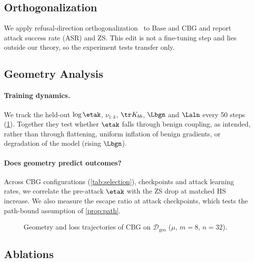 \subsection{Orthogonalization}
\label{sec:orthogonal}

We apply refusal-direction orthogonalization~\citep{arditi2024refusal} to Base and CBG and report attack success rate (ASR) and ZS. This edit is not a fine-tuning step and lies outside our theory, so the experiment tests transfer only.

\subsection{Geometry Analysis}
\label{sec:barrier_analysis}

\paragraph{Training dynamics.}
We track the held-out $\log\etak$, $\nu_{1:k}$, $\tr K_{bb}$, $\Lbgn$ and $\Laln$ every 50 steps (\cref{fig:geometry}). Together they test whether $\etak$ falls through benign coupling, as intended, rather than through flattening, uniform inflation of benign gradients, or degradation of the model (rising $\Lbgn$).

\paragraph{Does geometry predict outcomes?}
Across CBG configurations (\cref{tab:selection}), checkpoints and attack learning rates, we correlate the pre-attack $\etak$ with the ZS drop at matched HS increase. We also measure the escape ratio at attack checkpoints, which tests the path-bound assumption of \cref{prop:path}.

\begin{figure}[t]
\centering
{}
\caption{Geometry and loss trajectories of CBG on $\mathcal D_{\mathrm{geo}}$ ($\mu$, $m=8$, $n=32$).}
\label{fig:geometry}
\end{figure}

\subsection{Ablations}
\label{sec:ablation}

